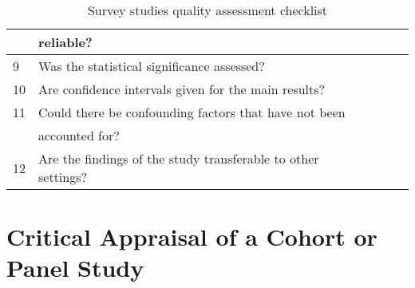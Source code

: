 \begin{table}[H]
\begin{center}
{\begin{tabular}{|l||l|l|l|l|}
                           & reliable?                                                        &&& \\
                        \hline
                        9  & Was the statistical significance assessed?                       &&& \\
                        \hline
                        10 & Are confidence intervals given for the main results?             &&& \\
                        \hline
                        11 & Could there be confounding factors that have not been            &&& \\
                           & accounted for?                                                   &&& \\
                        \hline
                        12 & Are the findings of the study transferable to other settings?    &&& \\
                        \hline
                \end{tabular}}
        \end{center}
        \caption{Survey studies quality assessment checklist}
        \label{table:surveyStudy}
\end{table}
    

\section*{Critical Appraisal of a Cohort or Panel Study}

